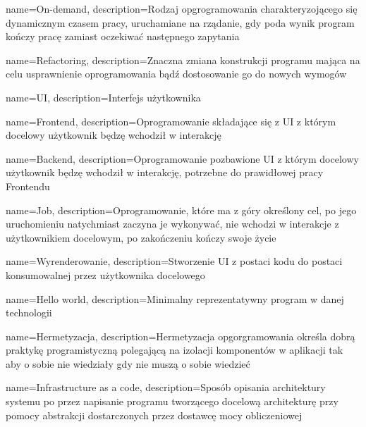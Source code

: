 

{
    name={On-demand},
    description={Rodzaj opgrogramowania charakteryzojącego się dynamicznym czasem pracy, uruchamiane na rządanie, gdy poda wynik program kończy pracę zamiast oczekiwać następnego zapytania}
}

{
    name={Refactoring},
    description={Znaczna zmiana konstrukcji programu mająca na celu usprawnienie oprogramowania bądź dostosowanie go do nowych wymogów}
}

{
    name={UI},
    description={Interfejs użytkownika}
}

{
    name={Frontend},
    description={Oprogramowanie składające się z UI z którym docelowy użytkownik będzę wchodził w interakcję}
}

{
    name={Backend},
    description={Oprogramowanie pozbawione UI z którym docelowy użytkownik będzę wchodził w interakcję, potrzebne do prawidłowej pracy Frontendu}
}

{
    name={Job},
    description={Oprogramowanie, które ma z góry określony cel, po jego uruchomieniu natychmiast zaczyna je wykonywać, nie wchodzi w interakcje z użytkownikiem docelowym, po zakończeniu kończy swoje życie}
}


{
    name={Wyrenderowanie},
    description={Stworzenie UI z postaci kodu do postaci konsumowalnej przez użytkownika docelowego}
}

{
    name={Hello world},
    description={Minimalny reprezentatywny program w danej technologii}
}

{
    name={Hermetyzacja},
    description={Hermetyzacja opgorgramowania określa dobrą praktykę programistyczną polegającą na izolacji komponentów w aplikacji tak aby o sobie nie wiedziały gdy nie muszą o sobie wiedzieć}
}

{
    name={Infrastructure as a code},
    description={Sposób opisania architektury systemu po przez napisanie programu tworzącego docelową architekturę przy pomocy abstrakcji dostarczonych przez dostawcę mocy obliczeniowej}
}

